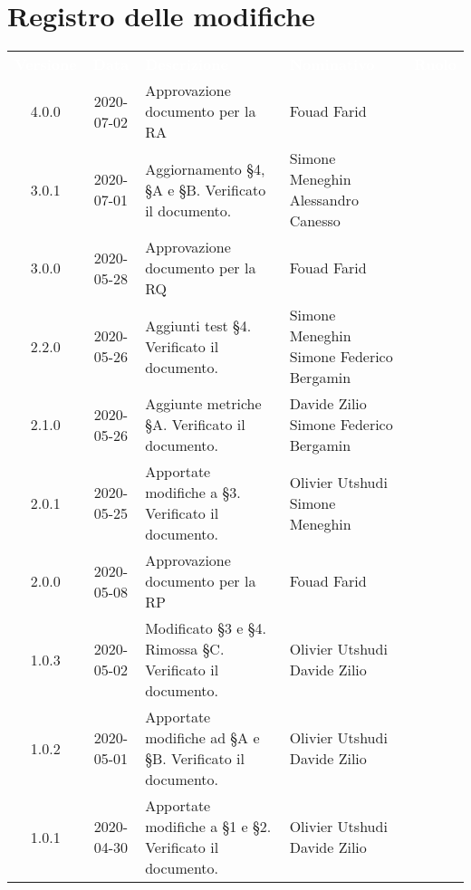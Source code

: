 \section*{Registro delle modifiche}
{
	\centering
	\begin{longtable}{ c c  C{4cm}  C{3.5cm}  C{3.5cm} }
		\textcolor{white}{\textbf{Versione}} & \textcolor{white}{\textbf{Data}} & \textcolor{white}{\textbf{Descrizione}} & \textcolor{white}{\textbf{Nominativo}} & \textcolor{white}{\textbf{Ruolo}}\\	
		4.0.0 & 2020-07-02 & Approvazione documento per la RA & Fouad Farid &\RdP \\
		3.0.1 & 2020-07-01 & Aggiornamento \S 4, \S A e \S B. Verificato il documento. & Simone Meneghin \newline Alessandro Canesso & \prog \newline \ver{} \\
		3.0.0 & 2020-05-28 & Approvazione documento per la RQ & Fouad Farid &\RdP \\	
		2.2.0 & 2020-05-26 & Aggiunti test \S 4. Verificato il documento. & Simone Meneghin \newline Simone Federico Bergamin  & \prog \newline \ver{} \\
		2.1.0 & 2020-05-26 & Aggiunte metriche \S A. Verificato il documento. & Davide Zilio \newline Simone Federico Bergamin  & \prog \newline \ver{} \\
		2.0.1 & 2020-05-25 & Apportate modifiche a §3. Verificato il documento.& Olivier Utshudi \newline Simone Meneghin & \prog \newline \ver{} \\
		2.0.0 & 2020-05-08 & Approvazione documento per la RP & Fouad Farid &\RdP \\
		1.0.3 & 2020-05-02 & Modificato \S 3 e \S 4. Rimossa \S C. Verificato il documento. & Olivier Utshudi \newline Davide Zilio &\prog \newline \ver{}\\		
		1.0.2 & 2020-05-01 & Apportate modifiche ad \S A e \S B. Verificato il documento. & Olivier Utshudi \newline Davide Zilio &\prog \newline \ver{}\\
		1.0.1 & 2020-04-30 & Apportate modifiche a \S 1 e \S 2. Verificato il documento. & Olivier Utshudi \newline Davide Zilio &\prog \newline \ver{}\\

\end{longtable}}
